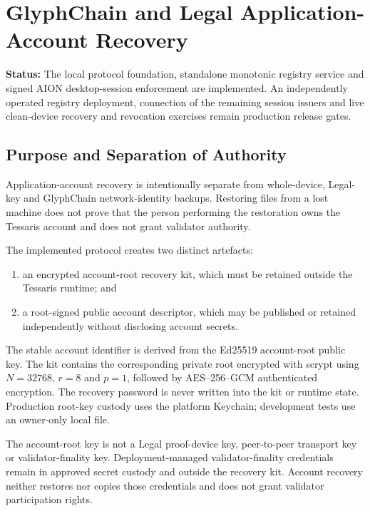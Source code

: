 
\section{GlyphChain and Legal Application-Account Recovery}
\label{sec:glyphchain-legal-application-account-recovery}

\noindent\textbf{Status:} The local protocol foundation, standalone monotonic
registry service and signed AION desktop-session enforcement are implemented.
An independently operated registry deployment, connection of the remaining
session issuers and live clean-device recovery and revocation exercises remain
production release gates.

\subsection{Purpose and Separation of Authority}

Application-account recovery is intentionally separate from whole-device,
Legal-key and GlyphChain network-identity backups.  Restoring files from a lost
machine does not prove that the person performing the restoration owns the
Tessaris account and does not grant validator authority.

The implemented protocol creates two distinct artefacts:

\begin{enumerate}[leftmargin=*]
  \item an encrypted account-root recovery kit, which must be retained outside
        the Tessaris runtime; and
  \item a root-signed public account descriptor, which may be published or
        retained independently without disclosing account secrets.
\end{enumerate}

The stable account identifier is derived from the Ed25519 account-root public
key.  The kit contains the corresponding private root encrypted with scrypt
using \(N=32768\), \(r=8\) and \(p=1\), followed by AES--256--GCM authenticated
encryption.  The recovery password is never written into the kit or runtime
state.  Production root-key custody uses the platform Keychain; development
tests use an owner-only local file.

The account-root key is not a Legal proof-device key, peer-to-peer transport
key or validator-finality key.  Deployment-managed validator-finality
credentials remain in approved secret custody and outside the recovery kit.
Account recovery neither restores nor copies those credentials and does not
grant validator participation rights.

